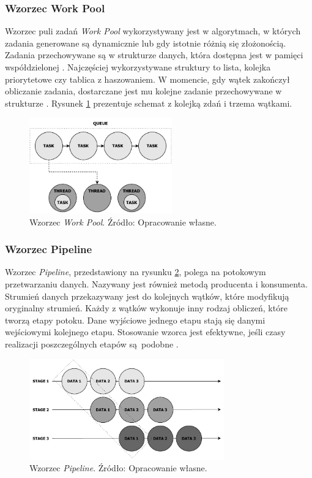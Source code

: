 \documentclass[12pt]{article}
\begin{document}
\subsubsection{Wzorzec Work Pool}\label{work-pool}
Wzorzec puli zadań \textit{Work Pool} wykorzystywany jest w algorytmach, w których zadania generowane są dynamicznie
lub gdy istotnie różnią się złożonością. Zadania przechowywane są w strukturze danych, która dostępna
jest w pamięci współdzielonej \cite{introduction-to-parallel-computing}. Najczęściej wykorzystywane struktury to lista, kolejka priorytetowe
czy tablica z haszowaniem. W momencie, gdy wątek zakończył obliczanie zadania, dostarczane jest mu
kolejne zadanie przechowywane w strukturze \cite{wprowadzenie-do-obliczen-rownoleglych}.
Rysunek \ref{fig:work-pool} prezentuje schemat z kolejką zdań i trzema wątkami.

\begin{figure}[H]
    \centering
	\includegraphics[width=0.55\textwidth]{patterns-work-pool.pdf}
    \caption{Wzorzec \textit{Work Pool}. Źródło: Opracowanie własne.}
    \label{fig:work-pool}
\end{figure}

\subsubsection{Wzorzec Pipeline}
Wzorzec \textit{Pipeline}, przedstawiony na rysunku \ref{fig:pipeline}, polega na potokowym przetwarzaniu danych. Nazywany jest również metodą producenta
i konsumenta. Strumień danych przekazywany jest do kolejnych wątków, które modyfikują oryginalny strumień.
Każdy z wątków wykonuje inny rodzaj obliczeń, które tworzą etapy potoku. Dane wyjściowe jednego etapu
stają się danymi wejściowymi kolejnego etapu. Stosowanie wzorca jest efektywne, jeśli czasy realizacji
poszczególnych etapów są~podobne \cite{wprowadzenie-do-obliczen-rownoleglych}.

\begin{figure}[H]
    \centering
	\includegraphics[width=0.75\textwidth]{patterns-pipeline.pdf}
    \caption{Wzorzec \textit{Pipeline}. Źródło: Opracowanie własne.}
    \label{fig:pipeline}
\end{figure}
\end{document}
